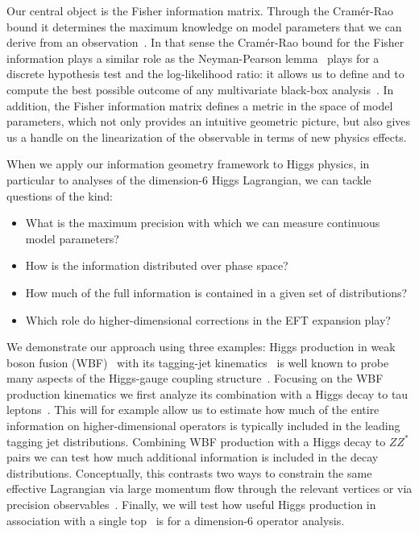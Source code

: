 Our central object is the Fisher information matrix. Through the
Cram\'er-Rao bound it determines the maximum knowledge on model
parameters that we can derive from an
observation~\cite{cramer-rao,information-applications}. In that sense the
Cram\'er-Rao bound for the Fisher information plays a similar role as
the Neyman-Pearson lemma~\cite{neyman-pearson} plays for a discrete
hypothesis test and the log-likelihood ratio: it allows us to define
and to compute the best possible outcome of any multivariate black-box
analysis~\cite{kyle_review,madmax1}. In addition, the Fisher
information matrix defines a metric in the space of model parameters,
which not only provides an intuitive geometric picture, but also gives
us a handle on the linearization of the observable in terms of new
physics effects.

When we apply our information geometry framework to Higgs physics, in
particular to analyses of the dimension-6 Higgs Lagrangian, we can
tackle questions of the kind:
%
\begin{itemize}[label=\raisebox{0.1ex}{\scriptsize$\bullet$}]
\item What is the maximum precision with which we can measure
  continuous model parameters?
\item How is the information distributed over phase space?
\item How much of the full information is contained in a given set of
  distributions?
\item Which role do higher-dimensional corrections in the EFT
  expansion play?
\end{itemize}
%
\bigskip

We demonstrate our approach using three examples: Higgs production in
weak boson fusion (WBF)~\cite{dave_thesis} with its tagging-jet
kinematics~\cite{tagging} is well known to probe many aspects of the
Higgs-gauge coupling structure~\cite{phi_jj}. Focusing on the WBF
production kinematics we first analyze its combination with a Higgs
decay to tau leptons~\cite{wbf_tau}. This will for example allow us to
estimate how much of the entire information on higher-dimensional
operators is typically included in the leading tagging jet
distributions. Combining WBF production with a Higgs decay to $ZZ^*$
pairs we can test how much additional information is included in the
decay distributions. Conceptually, this contrasts two ways to
constrain the same effective Lagrangian via large momentum flow
through the relevant vertices or via precision observables~\cite{higgs_fit}.
Finally, we will test how useful Higgs production in association with
a single top~\cite{top_higgs} is for a dimension-6 operator analysis.

